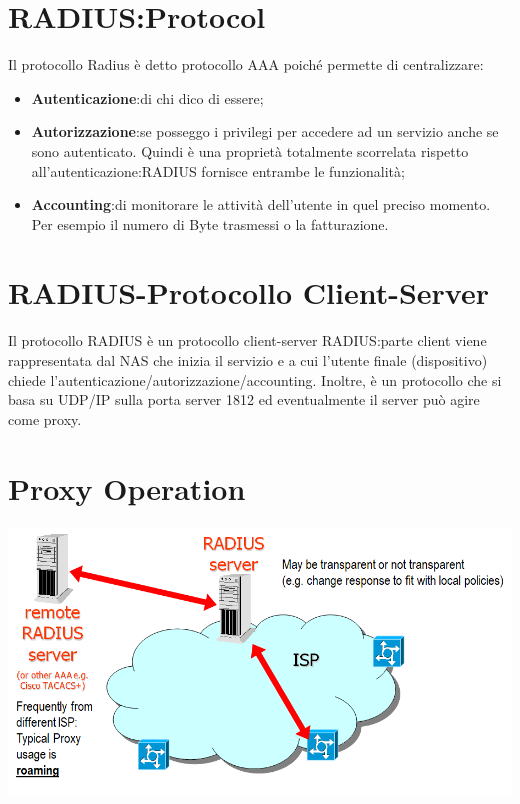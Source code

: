 \documentclass{book}
\theoremstyle{remark}
\begin{document}
\section{RADIUS:\@AAA Protocol}
Il protocollo Radius è detto protocollo AAA poiché permette di centralizzare:\begin{itemize}
	\item \textbf{Autenticazione}:\@verifica di chi dico di essere;\@
	\item \textbf{Autorizzazione}:\@verifica se posseggo i privilegi per accedere ad un servizio anche se sono autenticato\@. Quindi è una proprietà totalmente scorrelata rispetto all'autenticazione:RADIUS fornisce entrambe le funzionalità;\@
	\item \textbf{Accounting}:\@permette di monitorare le attività dell'utente in quel preciso momento\@. Per esempio il numero di Byte trasmessi o la fatturazione\@.
\end{itemize}
\section{RADIUS-Protocollo Client-Server}
Il protocollo RADIUS è un protocollo client-server RADIUS:\@la parte client viene rappresentata dal NAS che inizia il servizio e a cui l'utente finale (dispositivo) chiede l'autenticazione/autorizzazione/accounting\@. Inoltre, è un protocollo che si basa su UDP/IP sulla porta server 1812 ed eventualmente il server può agire come proxy\@.
\section{Proxy Operation}
\begin{center}
	\includegraphics[scale=0.5]{proxyserver.png}
\end{center}
\end{document}
